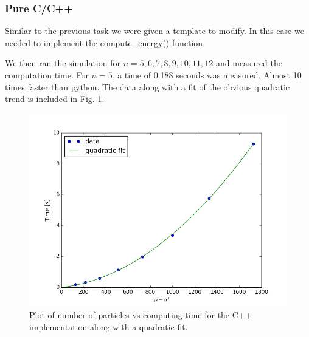 \documentclass[11pt,a4paper]{scrartcl}
\makeatletter
\newcommand{\listfile}[6]{
}
\makeatother
\begin{document}
\subsubsection{Pure C/C++}
Similar to the previous task we were given a template to modify. In this case we needed to implement the compute\_energy() function.
 \listfile{../src/ljfluid.cpp}{/src/ljfluid.cpp}{73}{91}{Compute Energy}{computeenergy}
We then ran the simulation for $n = {5,6,7,8,9,10,11,12}$ and measured the computation time. For $n=5$, a time of 0.188 seconds was measured. Almost 10 times faster than python. The data along with a fit of the obvious quadratic trend is included in Fig. \ref{fig:cpp}.
\begin{figure}[h]
\includegraphics[width=0.7\linewidth]{../fig/fit.png}
  \centering
  \caption{Plot of number of particles vs computing time for the C++ implementation along with a quadratic fit.}
\label{fig:cpp}
\end{figure}
\end{document}
